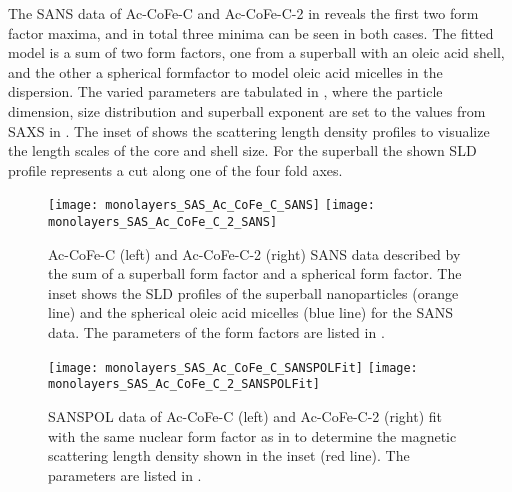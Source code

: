\documentclass[\main/dresen_thesis.tex]{subfiles}
\begin{document}
    The SANS data of Ac-CoFe-C and Ac-CoFe-C-2 in  reveals the first two form factor maxima, and in total three minima can be seen in both cases.
    The fitted model is a sum of two form factors, one from a superball with an oleic acid shell, and the other a spherical formfactor to model oleic acid micelles in the dispersion.
    The varied parameters are tabulated in , where the particle dimension, size distribution and superball exponent are set to the values from SAXS in .
    The inset of  shows the scattering length density profiles to visualize the length scales of the core and shell size.
    For the superball the shown SLD profile represents a cut along one of the four fold axes.

    \begin{figure}[!htbp]
      \centering
      \texttt{[image: monolayers\_SAS\_Ac\_CoFe\_C\_SANS]}
      \texttt{[image: monolayers\_SAS\_Ac\_CoFe\_C\_2\_SANS]}
      \caption{\label{fig:monolayers:nanoparticle:sans:superballAcAcFit}Ac-CoFe-C (left) and Ac-CoFe-C-2 (right) SANS data described by the sum of a superball form factor and a spherical form factor. The inset shows the SLD profiles of the superball nanoparticles (orange line) and the spherical oleic acid micelles (blue line) for the SANS data. The parameters of the form factors are listed in .}
    \end{figure}

    \begin{figure}[!htbp]
      \centering
      \texttt{[image: monolayers\_SAS\_Ac\_CoFe\_C\_SANSPOLFit]}
      \texttt{[image: monolayers\_SAS\_Ac\_CoFe\_C\_2\_SANSPOLFit]}
      \caption{\label{fig:monolayers:nanoparticle:sanspol:superballAcAcFit}SANSPOL data of Ac-CoFe-C (left) and Ac-CoFe-C-2 (right) fit with the same nuclear form factor as in  to determine the magnetic scattering length density  shown in the inset (red line). The parameters are listed in .}
    \end{figure}
\end{document}
